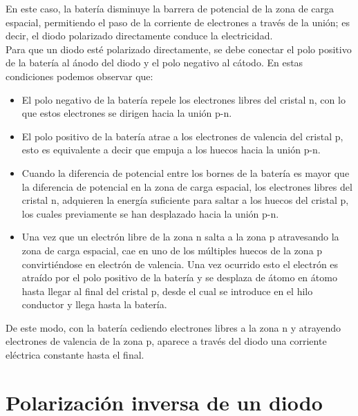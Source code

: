 \documentclass{article}
\begin{document}
En este caso, la batería disminuye la barrera de potencial de la zona de carga espacial, permitiendo el paso de la corriente de electrones a través de la unión; es decir, el diodo polarizado directamente conduce la electricidad.\citep{diodoWiki}\\

Para que un diodo esté polarizado directamente, se debe conectar el polo positivo de la batería al ánodo del diodo y el polo negativo al cátodo. En estas condiciones podemos observar que:\citep{diodoWiki}\\



\begin{itemize}
    \item El polo negativo de la batería repele los electrones libres del cristal n, con lo que estos electrones se dirigen hacia la unión p-n.
    \item El polo positivo de la batería atrae a los electrones de valencia del cristal p, esto es equivalente a decir que empuja a los huecos hacia la unión p-n.
    \item Cuando la diferencia de potencial entre los bornes de la batería es mayor que la diferencia de potencial en la zona de carga espacial, los electrones libres del cristal n, adquieren la energía suficiente para saltar a los huecos del cristal p, los cuales previamente se han desplazado hacia la unión p-n.
    \item Una vez que un electrón libre de la zona n salta a la zona p atravesando la zona de carga espacial, cae en uno de los múltiples huecos de la zona p convirtiéndose en electrón de valencia. Una vez ocurrido esto el electrón es atraído por el polo positivo de la batería y se desplaza de átomo en átomo hasta llegar al final del cristal p, desde el cual se introduce en el hilo conductor y llega hasta la batería.
    \end{itemize}
    
    De este modo, con la batería cediendo electrones libres a la zona n y atrayendo electrones de valencia de la zona p, aparece a través del diodo una corriente eléctrica constante hasta el final.\citep{diodoWiki}\\




\section{Polarización inversa de un diodo}
\end{document}
